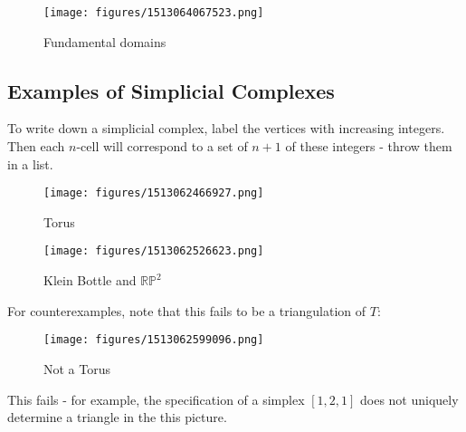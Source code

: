 \begin{example}[Surfaces]

\begin{figure}
\centering
\texttt{[image: figures/1513064067523.png]}
\caption{Fundamental domains}
\end{figure}

\end{example}

\hypertarget{examples-of-simplicial-complexes}{%
\subsection{Examples of Simplicial
Complexes}\label{examples-of-simplicial-complexes}}

\begin{remark}

To write down a simplicial complex, label the vertices with increasing
integers. Then each \(n\)-cell will correspond to a set of \(n+1\) of
these integers - throw them in a list.

\end{remark}

\begin{example}[Torus]

\begin{figure}
\centering
\texttt{[image: figures/1513062466927.png]}
\caption{Torus}
\end{figure}

\end{example}

\begin{example}

\begin{figure}
\centering
\texttt{[image: figures/1513062526623.png]}
\caption{Klein Bottle and \({\mathbb{RP}}^2\)}
\end{figure}

\end{example}

\begin{example}

For counterexamples, note that this fails to be a triangulation of
\(T\):

\begin{figure}
\centering
\texttt{[image: figures/1513062599096.png]}
\caption{Not a Torus}
\end{figure}

This fails - for example, the specification of a simplex \([1,2,1]\)
does not uniquely determine a triangle in the this picture.

\end{example}


